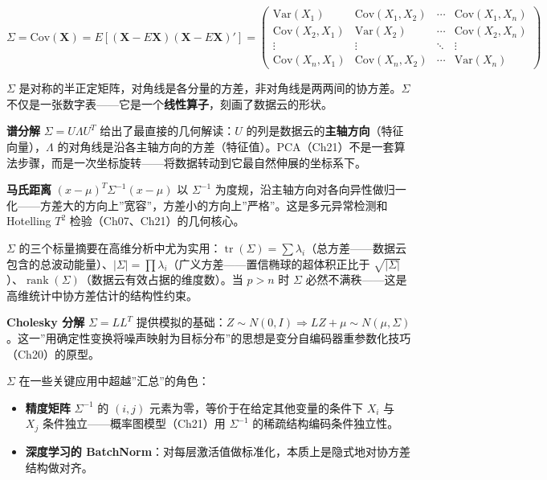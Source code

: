 \documentclass[
]{book}
\providecommand{\tightlist}{%
  \setlength{\itemsep}{0pt}\setlength{\parskip}{0pt}}
\begin{document}
\[\Sigma = \text{Cov}(\mathbf{X}) = E[(\mathbf{X} - E\mathbf{X})(\mathbf{X} - E\mathbf{X})'] =
\begin{pmatrix}
\text{Var}(X_1) & \text{Cov}(X_1,X_2) & \cdots & \text{Cov}(X_1,X_n) \\
\text{Cov}(X_2,X_1) & \text{Var}(X_2) & \cdots & \text{Cov}(X_2,X_n) \\
\vdots & \vdots & \ddots & \vdots \\
\text{Cov}(X_n,X_1) & \text{Cov}(X_n,X_2) & \cdots & \text{Var}(X_n)
\end{pmatrix}\]

\(\Sigma\) 是对称的半正定矩阵，对角线是各分量的方差，非对角线是两两间的协方差。\(\Sigma\) 不仅是一张数字表------它是一个\textbf{线性算子}，刻画了数据云的形状。

\textbf{谱分解} \(\Sigma = U \Lambda U^T\) 给出了最直接的几何解读：\(U\) 的列是数据云的\textbf{主轴方向}（特征向量），\(\Lambda\) 的对角线是沿各主轴方向的方差（特征值）。PCA（Ch21）不是一套算法步骤，而是一次坐标旋转------将数据转动到它最自然伸展的坐标系下。

\textbf{马氏距离} \((x - \mu)^T \Sigma^{-1} (x - \mu)\) 以 \(\Sigma^{-1}\) 为度规，沿主轴方向对各向异性做归一化------方差大的方向上''宽容''，方差小的方向上''严格''。这是多元异常检测和 Hotelling \(T^2\) 检验（Ch07、Ch21）的几何核心。

\(\Sigma\) 的三个标量摘要在高维分析中尤为实用：\(\operatorname{tr}(\Sigma) = \sum \lambda_i\)（总方差------数据云包含的总波动能量）、\(|\Sigma| = \prod \lambda_i\)（广义方差------置信椭球的超体积正比于 \(\sqrt{|\Sigma|}\)）、\(\operatorname{rank}(\Sigma)\)（数据云有效占据的维度数）。当 \(p > n\) 时 \(\Sigma\) 必然不满秩------这是高维统计中协方差估计的结构性约束。

\textbf{Cholesky 分解} \(\Sigma = LL^T\) 提供模拟的基础：\(Z \sim N(0,I) \Rightarrow LZ + \mu \sim N(\mu, \Sigma)\)。这一''用确定性变换将噪声映射为目标分布''的思想是变分自编码器重参数化技巧（Ch20）的原型。

\(\Sigma\) 在一些关键应用中超越''汇总''的角色：

\begin{itemize}
\tightlist
\item
  \textbf{精度矩阵} \(\Sigma^{-1}\) 的 \((i,j)\) 元素为零，等价于在给定其他变量的条件下 \(X_i\) 与 \(X_j\) 条件独立------概率图模型（Ch21）用 \(\Sigma^{-1}\) 的稀疏结构编码条件独立性。
\item
  \textbf{深度学习的 BatchNorm}：对每层激活值做标准化，本质上是隐式地对协方差结构做对齐。
\end{itemize}
\end{document}
